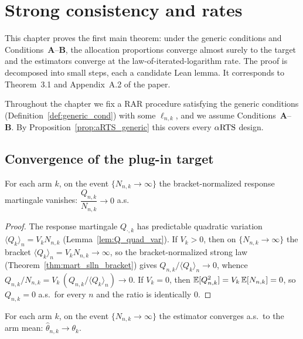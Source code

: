 \chapter{Strong consistency and rates}
\label{chap:consistency}

This chapter proves the first main theorem: under the generic conditions and
Conditions~\textbf{A}--\textbf{B}, the allocation proportions converge almost
surely to the target and the estimators converge at the law-of-iterated-logarithm
rate. The proof is decomposed into small steps, each a candidate Lean lemma. It
corresponds to Theorem~3.1 and Appendix~A.2 of the paper.

Throughout the chapter we fix a RAR procedure satisfying the generic conditions
(Definition~\ref{def:generic_cond}) with some $\ell_{n,k}$, and we assume
Conditions~\textbf{A}--\textbf{B}. By Proposition~\ref{prop:aRTS_generic} this
covers every $\alpha\text{RTS}$ design.

\section{Convergence of the plug-in target}
\label{sec:cons_rho_limit}

\begin{lemma}\label{lem:respMart_div_count_slln}
\leanok
{}
For each arm $k$, on the event $\{N_{n,k}\to\infty\}$ the bracket-normalized response
martingale vanishes: $\dfrac{Q_{n,k}}{N_{n,k}}\to 0$ a.s.
\end{lemma}

\begin{proof}\leanok
{}
The response martingale $Q_{\cdot,k}$ has predictable quadratic variation
$\langle Q_k\rangle_n = V_k N_{n,k}$ (Lemma~\ref{lem:Q_quad_var}). If $V_k>0$, then on
$\{N_{n,k}\to\infty\}$ the bracket $\langle Q_k\rangle_n = V_k N_{n,k}\to\infty$, so the
bracket-normalized strong law (Theorem~\ref{thm:mart_slln_bracket}) gives
$Q_{n,k}/\langle Q_k\rangle_n\to0$, whence
$Q_{n,k}/N_{n,k} = V_k\,(Q_{n,k}/\langle Q_k\rangle_n)\to0$. If $V_k=0$, then
$\mathbb{E}[Q_{n,k}^2] = V_k\,\mathbb{E}[N_{n,k}] = 0$, so $Q_{n,k}=0$ a.s.\ for every $n$ and the ratio is
identically $0$.
\end{proof}

\begin{lemma}\label{lem:theta_limit_infinite}
\leanok
{}
For each arm $k$, on the event $\{N_{n,k}\to\infty\}$ the estimator converges a.s.\ to the arm
mean: $\hat\theta_{n,k}\to\theta_k$.
\end{lemma}

